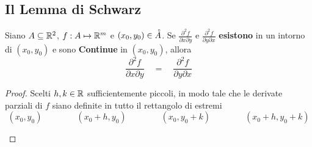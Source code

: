 \subsection{Il Lemma di Schwarz}
\begin{lemma}[di Schwarz]
	\label{lemma:schwarz}
	Siano $A \subseteq \mathbb{R}^2$, $f:A \mapsto \mathbb{R}^m$ e $(x_0, y_0) \in \accentset{\circ}{A}$. Se $\frac{\partial^2 f}{\partial x \partial y}$ e $\frac{\partial^2 f}{\partial y \partial x}$ \textbf{esistono} in un intorno di $(x_0, y_0)$ e sono \textbf{Continue} in $(x_0, y_0)$, allora
	\[\frac{\partial^2 f}{\partial x \partial y} \quad = \quad \frac{\partial^2 f}{\partial y \partial x}\]
	\begin{proof}
		Scelti $h, k \in \mathbb{R}$ sufficientemente piccoli, in modo tale che le derivate parziali di $f$ siano definite in tutto il rettangolo di estremi
		\[(x_0, y_0) \qquad\qquad (x_0 + h, y_0) \qquad\qquad (x_0, y_0 + k) \qquad\qquad (x_0 + h, y_0 + k)\]
		\begin{center}
\end{center}
\end{proof}
\end{lemma}

